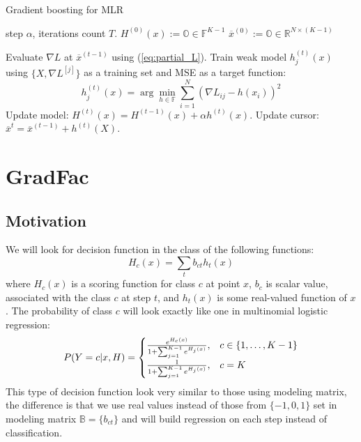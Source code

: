 \documentclass{article}
\begin{document}
\begin{algorithm}[tb]
   \caption{Gradient boosting for MLR}
   \label{alg:boost_mlr}
\begin{algorithmic}
    step $\alpha$, iterations count $T$.
   \STATE $H^{(0)}(x):= \mathbb{O} \in \mathbb{F}^{K-1}$ 
   \STATE $\overline{x}^{(0)} := \mathbb{O} \in \mathbb{R}^{N \times (K-1)}$ 

   		\STATE Evaluate $\nabla L$ at $\overline{x}^{(t-1)}$ using (\ref{eq:partial_L}).
   			\STATE Train weak model $h_{j}^{(t)}(x)$ using $\{X,\nabla L^{[j]}\}$ as a training set and MSE as a target function:
   			\[
				h_{j}^{(t)}(x)=\arg\min_{h \in \mathbb{F}} \sum_{i=1}^{N}\left(\nabla L_{ij}-h(x_{i})\right)^{2}
			\]
		\ENDFOR
		\STATE Update model: $H^{(t)}(x)=H^{(t-1)}(x)+\alpha h^{(t)}(x)$.
		\STATE Update cursor: $\overline{x}^{t} = \overline{x}^{(t-1)} + h^{(t)}(X)$.
   \ENDFOR
   
\end{algorithmic}
\end{algorithm}


\section{GradFac}

\subsection{Motivation}
We will look for decision function in the class of the following functions:
$$
H_c(x) = \sum_t b_{ct} h_t(x) 
$$
where $H_c(x)$ is a scoring function for class $c$ at point $x$, $b_c$ is scalar value, associated with the class $c$ at step $t$, and $h_t(x)$ is some real-valued function of $x$. The probability of class $c$ will look exactly like one in multinomial logistic regression:
\begin{equation}
  P(Y = c \arrowvert x, H) =
  \begin{cases}
    \frac{ e^{H_{c}(x)} }
       { 1+\sum_{j=1}^{K-1} e^{H_{j}(x)} }
    , & c \in \{1, \ldots, K-1 \} \\

    \frac{ 1 }
       { 1 + \sum_{j=1}^{K-1} e^{H_{j}(x)} }
    , & c=K
  \end{cases}
\end{equation}
This type of decision function look very similar to those using modeling matrix, the difference is that we use real values instead of those from $\{-1,0,1\}$ set in modeling matrix $\mathbb{B} = \{b_{ct}\}$ and will build regression on each step instead of classification.
\end{document}
